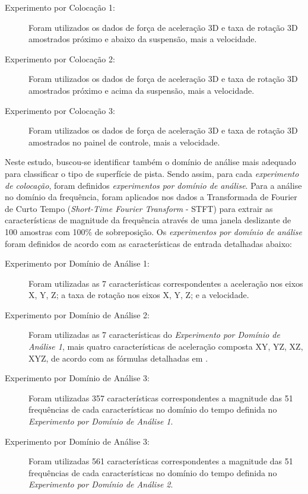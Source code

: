 \begin{description}
	
	\item[Experimento por Colocação 1:] Foram utilizados os dados de força de aceleração 3D e taxa de rotação 3D amostrados próximo e abaixo da suspensão, mais a velocidade.
    
    \item[Experimento por Colocação 2:] Foram utilizados os dados de força de aceleração 3D e taxa de rotação 3D amostrados próximo e acima da suspensão, mais a velocidade.
    
    \item[Experimento por Colocação 3:] Foram utilizados os dados de força de aceleração 3D e taxa de rotação 3D amostrados no painel de controle, mais a velocidade.
    
\end{description}

Neste estudo, buscou-se identificar também o domínio de análise mais adequado para classificar o tipo de superfície de pista. Sendo assim, para cada \emph{experimento de colocação}, foram definidos \emph{experimentos por domínio de análise}. Para a análise no domínio da frequência, foram aplicados nos dados a Transformada de Fourier de Curto Tempo (\textit{Short-Time Fourier Transform} - STFT) para extrair as características de magnitude da frequência através de uma janela deslizante de 100 amostras com 100\% de sobreposição. Os \emph{experimentos por domínio de análise} foram definidos de acordo com as características de entrada detalhadas abaixo:

\begin{description}

    \item[Experimento por Domínio de Análise 1:] Foram utilizadas as 7 características correspondentes a aceleração nos eixos X, Y, Z; a taxa de rotação nos eixos X, Y, Z; e a velocidade.
    
    \item[Experimento por Domínio de Análise 2:] Foram utilizadas as 7 características do \emph{Experimento por Domínio de Análise 1}, mais quatro características de aceleração composta XY, YZ, XZ, XYZ, de acordo com as fórmulas detalhadas em \cite{Tan2019}.
    
    \item[Experimento por Domínio de Análise 3:] Foram utilizadas 357 características correspondentes a magnitude das 51 frequências de cada características no domínio do tempo definida no \emph{Experimento por Domínio de Análise 1}.
    
    \item[Experimento por Domínio de Análise 3:] Foram utilizadas 561 características correspondentes a magnitude das 51 frequências de cada características no domínio do tempo definida no \emph{Experimento por Domínio de Análise 2}.
    
\end{description}

